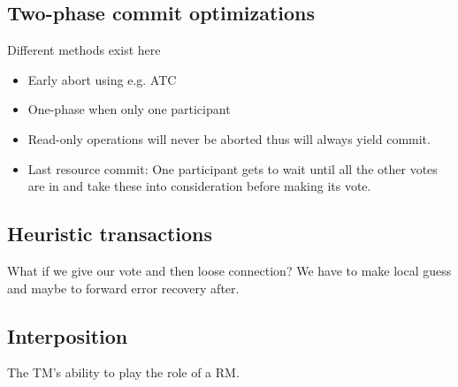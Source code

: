 \subsection{Two-phase commit optimizations}
Different methods exist here
\begin{itemize}
\item Early abort using e.g. ATC
\item One-phase when only one participant
\item Read-only operations will never be aborted thus will always yield commit.
\item Last resource commit: One participant gets to wait until all the other votes are in and take these into consideration before making its vote.
\end{itemize}

\subsection{Heuristic transactions}
What if we give our vote and then loose connection? We have to make local guess and maybe to forward error recovery after.

\subsection{Interposition}
The TM's ability to play the role of a RM.
